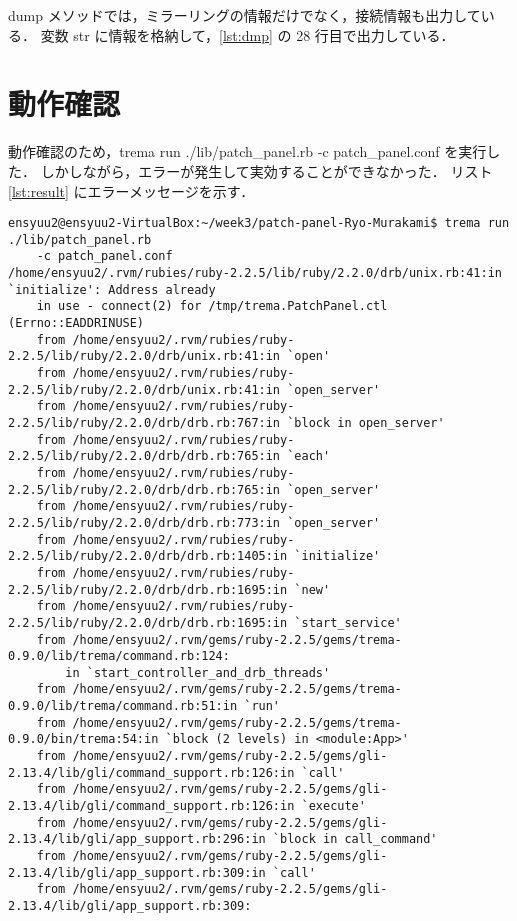 ﻿\documentclass[10pt,a4paper,onecolumn]{jarticle}
\begin{document}
dump メソッドでは，ミラーリングの情報だけでなく，接続情報も出力している．
変数 str に情報を格納して，\ref{lst:dmp} の 28 行目で出力している．

\section{動作確認}

動作確認のため，trema run ./lib/patch\_panel.rb -c patch\_panel.conf を実行した．
しかしながら，エラーが発生して実効することができなかった．
リスト \ref{lst:result} にエラーメッセージを示す．

\begin{lstlisting}[caption = 動作結果, label = lst:result]
ensyuu2@ensyuu2-VirtualBox:~/week3/patch-panel-Ryo-Murakami$ trema run ./lib/patch_panel.rb 
	-c patch_panel.conf
/home/ensyuu2/.rvm/rubies/ruby-2.2.5/lib/ruby/2.2.0/drb/unix.rb:41:in `initialize': Address already 
	in use - connect(2) for /tmp/trema.PatchPanel.ctl (Errno::EADDRINUSE)
	from /home/ensyuu2/.rvm/rubies/ruby-2.2.5/lib/ruby/2.2.0/drb/unix.rb:41:in `open'
	from /home/ensyuu2/.rvm/rubies/ruby-2.2.5/lib/ruby/2.2.0/drb/unix.rb:41:in `open_server'
	from /home/ensyuu2/.rvm/rubies/ruby-2.2.5/lib/ruby/2.2.0/drb/drb.rb:767:in `block in open_server'
	from /home/ensyuu2/.rvm/rubies/ruby-2.2.5/lib/ruby/2.2.0/drb/drb.rb:765:in `each'
	from /home/ensyuu2/.rvm/rubies/ruby-2.2.5/lib/ruby/2.2.0/drb/drb.rb:765:in `open_server'
	from /home/ensyuu2/.rvm/rubies/ruby-2.2.5/lib/ruby/2.2.0/drb/drb.rb:773:in `open_server'
	from /home/ensyuu2/.rvm/rubies/ruby-2.2.5/lib/ruby/2.2.0/drb/drb.rb:1405:in `initialize'
	from /home/ensyuu2/.rvm/rubies/ruby-2.2.5/lib/ruby/2.2.0/drb/drb.rb:1695:in `new'
	from /home/ensyuu2/.rvm/rubies/ruby-2.2.5/lib/ruby/2.2.0/drb/drb.rb:1695:in `start_service'
	from /home/ensyuu2/.rvm/gems/ruby-2.2.5/gems/trema-0.9.0/lib/trema/command.rb:124:
		in `start_controller_and_drb_threads'
	from /home/ensyuu2/.rvm/gems/ruby-2.2.5/gems/trema-0.9.0/lib/trema/command.rb:51:in `run'
	from /home/ensyuu2/.rvm/gems/ruby-2.2.5/gems/trema-0.9.0/bin/trema:54:in `block (2 levels) in <module:App>'
	from /home/ensyuu2/.rvm/gems/ruby-2.2.5/gems/gli-2.13.4/lib/gli/command_support.rb:126:in `call'
	from /home/ensyuu2/.rvm/gems/ruby-2.2.5/gems/gli-2.13.4/lib/gli/command_support.rb:126:in `execute'
	from /home/ensyuu2/.rvm/gems/ruby-2.2.5/gems/gli-2.13.4/lib/gli/app_support.rb:296:in `block in call_command'
	from /home/ensyuu2/.rvm/gems/ruby-2.2.5/gems/gli-2.13.4/lib/gli/app_support.rb:309:in `call'
	from /home/ensyuu2/.rvm/gems/ruby-2.2.5/gems/gli-2.13.4/lib/gli/app_support.rb:309:

\end{lstlisting}
\end{document}
